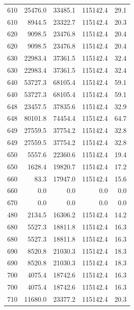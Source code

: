 \begin{longtable}{rrrrr}
    610 & \num{25476.0} & \num{33485.1} & \num{115142.4} & 29.1 \\
    610 & \num{8944.5} & \num{23322.7} & \num{115142.4} & 20.3 \\
    620 & \num{9098.5} & \num{23476.8} & \num{115142.4} & 20.4 \\
    620 & \num{9098.5} & \num{23476.8} & \num{115142.4} & 20.4 \\
    630 & \num{22983.4} & \num{37361.5} & \num{115142.4} & 32.4 \\
    630 & \num{22983.4} & \num{37361.5} & \num{115142.4} & 32.4 \\
    640 & \num{53727.3} & \num{68105.4} & \num{115142.4} & 59.1 \\
    640 & \num{53727.3} & \num{68105.4} & \num{115142.4} & 59.1 \\
    648 & \num{23457.5} & \num{37835.6} & \num{115142.4} & 32.9 \\
    648 & \num{80101.8} & \num{74454.4} & \num{115142.4} & 64.7 \\
    649 & \num{27559.5} & \num{37754.2} & \num{115142.4} & 32.8 \\
    649 & \num{27559.5} & \num{37754.2} & \num{115142.4} & 32.8 \\
    650 & \num{5557.6} & \num{22360.6} & \num{115142.4} & 19.4 \\
    650 & \num{1628.4} & \num{19820.7} & \num{115142.4} & 17.2 \\
    660 & \num{83.3} & \num{17947.0} & \num{115142.4} & 15.6 \\
    660 & \num{0.0} & \num{0.0} & \num{0.0} & 0.0 \\
    670 & \num{0.0} & \num{0.0} & \num{0.0} & 0.0 \\
    480 & \num{2134.5} & \num{16306.2} & \num{115142.4} & 14.2 \\
    680 & \num{5527.3} & \num{18811.8} & \num{115142.4} & 16.3 \\
    680 & \num{5527.3} & \num{18811.8} & \num{115142.4} & 16.3 \\
    690 & \num{8520.8} & \num{21030.3} & \num{115142.4} & 18.3 \\
    690 & \num{8520.8} & \num{21030.3} & \num{115142.4} & 18.3 \\
    700 & \num{4075.4} & \num{18742.6} & \num{115142.4} & 16.3 \\
    700 & \num{4075.4} & \num{18742.6} & \num{115142.4} & 16.3 \\
    710 & \num{11680.0} & \num{23377.2} & \num{115142.4} & 20.3 \\

\end{longtable}

